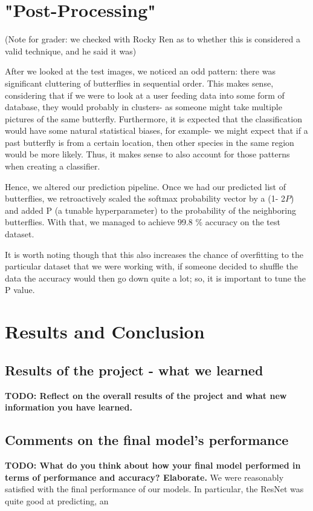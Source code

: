 \documentclass[10pt]{article} %
\begin{document}
\section{"Post-Processing"}
(Note for grader: we checked with Rocky Ren as to whether this is considered a valid technique, and he said it was)\par
After we looked at the test images, we noticed an odd pattern: there was significant cluttering of butterflies in sequential order. This makes sense, considering that if we were to look at a user feeding data into some form of database, they would probably in clusters- as someone might take multiple pictures of the same butterfly. Furthermore, it is expected that the classification would have some natural statistical biases, for example- we might expect that if a past butterfly is from a certain location, then other species in the same region would be more likely. Thus, it makes sense to also account for those patterns when creating a classifier. \par
Hence, we altered our prediction pipeline. Once we had our predicted list of butterflies, we retroactively scaled the softmax probability vector by a (1- 2$P$) and added P (a tunable hyperparameter) to the probability of the neighboring butterflies. With that, we managed to achieve 99.8 \% accuracy on the test dataset. \par
It is worth noting though that this also increases the chance of overfitting to the particular dataset that we were working with, if someone decided to shuffle the data the accuracy would then go down quite a lot; so, it is important to tune the P value.

\section{Results and Conclusion}
\subsection{Results of the project - what we learned}
\textbf{TODO: Reflect on the overall results of the project and what new information you have learned.}

\subsection{Comments on the final model's performance}
\textbf{TODO: What do you think about how your final model performed in terms of performance and accuracy? Elaborate.}
We were reasonably satisfied with the final performance of our models. In particular, the ResNet was quite good at predicting, an
\end{document}
